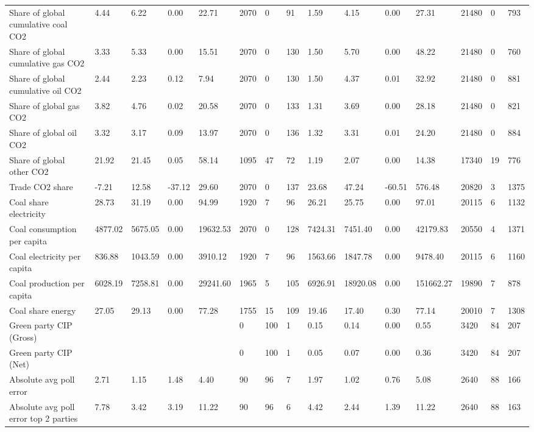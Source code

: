 \begin{longtable}{lllllllllllllll}
Share of global cumulative coal CO2 & 4.44 & 6.22 & 0.00 & 22.71 & 2070 & 0 & 91 & 1.59 & 4.15 & 0.00 & 27.31 & 21480 & 0 & 793\\
Share of global cumulative gas CO2 & 3.33 & 5.33 & 0.00 & 15.51 & 2070 & 0 & 130 & 1.50 & 5.70 & 0.00 & 48.22 & 21480 & 0 & 760\\
\addlinespace
Share of global cumulative oil CO2 & 2.44 & 2.23 & 0.12 & 7.94 & 2070 & 0 & 130 & 1.50 & 4.37 & 0.01 & 32.92 & 21480 & 0 & 881\\
Share of global gas CO2 & 3.82 & 4.76 & 0.02 & 20.58 & 2070 & 0 & 133 & 1.31 & 3.69 & 0.00 & 28.18 & 21480 & 0 & 821\\
Share of global oil CO2 & 3.32 & 3.17 & 0.09 & 13.97 & 2070 & 0 & 136 & 1.32 & 3.31 & 0.01 & 24.20 & 21480 & 0 & 884\\
Share of global other CO2 & 21.92 & 21.45 & 0.05 & 58.14 & 1095 & 47 & 72 & 1.19 & 2.07 & 0.00 & 14.38 & 17340 & 19 & 776\\
Trade CO2 share & -7.21 & 12.58 & -37.12 & 29.60 & 2070 & 0 & 137 & 23.68 & 47.24 & -60.51 & 576.48 & 20820 & 3 & 1375\\
\addlinespace
Coal share electricity & 28.73 & 31.19 & 0.00 & 94.99 & 1920 & 7 & 96 & 26.21 & 25.75 & 0.00 & 97.01 & 20115 & 6 & 1132\\
Coal consumption per capita & 4877.02 & 5675.05 & 0.00 & 19632.53 & 2070 & 0 & 128 & 7424.31 & 7451.40 & 0.00 & 42179.83 & 20550 & 4 & 1371\\
Coal electricity per capita & 836.88 & 1043.59 & 0.00 & 3910.12 & 1920 & 7 & 96 & 1563.66 & 1847.78 & 0.00 & 9478.40 & 20115 & 6 & 1160\\
Coal production per capita & 6028.19 & 7258.81 & 0.00 & 29241.60 & 1965 & 5 & 105 & 6926.91 & 18920.08 & 0.00 & 151662.27 & 19890 & 7 & 878\\
Coal share energy & 27.05 & 29.13 & 0.00 & 77.28 & 1755 & 15 & 109 & 19.46 & 17.40 & 0.30 & 77.14 & 20010 & 7 & 1308\\
\addlinespace
Green party CIP (Gross) &  &  &  &  & 0 & 100 & 1 & 0.15 & 0.14 & 0.00 & 0.55 & 3420 & 84 & 207\\
Green party CIP (Net) &  &  &  &  & 0 & 100 & 1 & 0.05 & 0.07 & 0.00 & 0.36 & 3420 & 84 & 207\\
Absolute avg poll error & 2.71 & 1.15 & 1.48 & 4.40 & 90 & 96 & 7 & 1.97 & 1.02 & 0.76 & 5.08 & 2640 & 88 & 166\\
Absolute avg poll error top 2 parties & 7.78 & 3.42 & 3.19 & 11.22 & 90 & 96 & 6 & 4.42 & 2.44 & 1.39 & 11.22 & 2640 & 88 & 163\\

\end{longtable}
